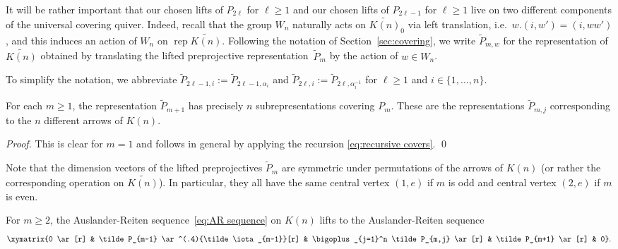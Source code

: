 \documentclass[smallextended,envcountsect,envcountsame]{svjour3}
\numberwithin{equation}{section}
\newcommand{\rep}{\operatorname{rep}}
\begin{document}
It will be rather important that our chosen lifts of $P_{2\ell}$ for $\ell\ge1$ and our chosen lifts of $P_{2\ell-1}$ for $\ell\ge1$ live on two different components of the universal covering quiver.
Indeed, recall that the group $W_n$ naturally acts on $\widetilde{K(n)}_0$ via left translation, i.e.~$w.(i,w')=(i,ww')$, and this induces an action of $W_n$ on $\rep\widetilde{K(n)}$.
Following the notation of Section~\ref{sec:covering}, we write $\tilde P_{m,w}$ for the representation of $\widetilde{K(n)}$ obtained by translating the lifted preprojective representation~$\tilde P_m$ by the action of $w\in W_n$.
\begin{remark}
  \label{rem:abbreviations}
  To simplify the notation, we abbreviate $\tilde P_{2\ell-1,i}:=\tilde P_{2\ell-1,\alpha_i}$ and $\tilde P_{2\ell,i}:=\tilde P_{2\ell,\alpha_i^{-1}}$ for $\ell\ge1$ and $i\in\{1,\ldots,n\}$.
\end{remark}
\begin{lemma}
  \label{le:shifted subreps}
  For each $m\ge1$, the representation $\tilde P_{m+1}$ has precisely $n$ subrepresentations covering $P_m$.
  These are the representations $\tilde P_{m,j}$ corresponding to the $n$ different arrows of $K(n)$. 
\end{lemma}
\begin{proof}
  This is clear for $m=1$ and follows in general by applying the recursion \eqref{eq:recursive covers}.
\qed\end{proof}
\begin{remark}
  Note that the dimension vectors of the lifted preprojectives $\tilde P_m$ are symmetric under permutations of the arrows of $K(n)$ (or rather the corresponding operation on $\widetilde{K(n)}$).
  In particular, they all have the same central vertex $(1,e)$ if $m$ is odd and central vertex $(2,e)$ if $m$ is even.
\end{remark}

\begin{corollary}
  \label{cor:AR lift}
  For $m\ge2$, the Auslander-Reiten sequence~\eqref{eq:AR sequence} on $K(n)$ lifts to the Auslander-Reiten sequence
  \begin{equation}
    \label{eq:lifted AR sequence}
    \xymatrix{0 \ar[r] & \tilde P_{m-1} \ar^(.4){\tilde\iota_{m-1}}[r] & \bigoplus_{j=1}^n \tilde P_{m,j} \ar[r] & \tilde P_{m+1} \ar[r] & 0}.
  \end{equation}
\end{corollary} 
\end{document}
